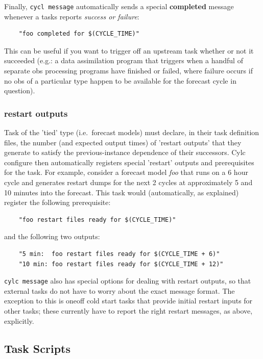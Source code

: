 \documentclass[11pt,a4paper]{article}
\begin{document}
Finally, \lstinline=cycl message= automatically sends a special {\bf
completed} message whenever a tasks reports {\em success or failure}:
\begin{lstlisting}
    "foo completed for $(CYCLE_TIME)"
\end{lstlisting}
 
This can be useful if you want to trigger off an upstream task whether
or not it succeeded (e.g.: a data assimilation program that triggers
when a handful of separate obs processing programs have finished or
failed, where failure occurs if no obs of a particular type happen to be
available for the forecast cycle in question).

\subsubsection{restart outputs}

Task of the 'tied' type (i.e.\ forecast models) must declare, in their
task definition files, the number (and expected output times) of
'restart outputs' that they generate to satisfy the previous-instance
dependence of their successors. Cylc configure then automatically
registers special 'restart' outputs and prerequisites for the task.
For example, consider a forecast model {\em foo} that runs on a
6 hour cycle and generates restart dumps for the next 2 cycles at
approximately 5 and 10 minutes into the forecast. This task would  
(automatically, as explained) register the following prerequisite:

\begin{lstlisting}
    "foo restart files ready for $(CYCLE_TIME)"
\end{lstlisting}

and the following two outputs:

\begin{lstlisting}
    "5 min:  foo restart files ready for $(CYCLE_TIME + 6)"
    "10 min: foo restart files ready for $(CYCLE_TIME + 12)"
\end{lstlisting}

\lstinline=cylc message= also has special options for dealing with 
restart outputs, so that external tasks do not have to worry about the
exact message format. The exception to this is oneoff cold start tasks
that provide initial restart inputs for other tasks; these currently 
have to report the right restart messages, as above, explicitly.

\pagebreak
\subsection{Task Scripts}
\label{TaskScripts}
\end{document}
